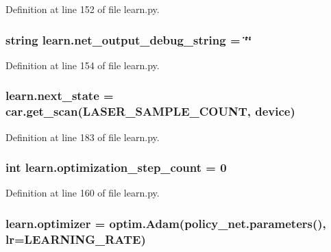 Definition at line 152 of file learn.\+py.

\subsubsection[{\texorpdfstring{net\+\_\+output\+\_\+debug\+\_\+string}{net_output_debug_string}}]{\setlength{\rightskip}{0pt plus 5cm}string learn.\+net\+\_\+output\+\_\+debug\+\_\+string = \char`\"{}\char`\"{}}\hypertarget{namespacelearn_a2cfc8cc1bdb6765aba4bd1de7af92885}{}\label{namespacelearn_a2cfc8cc1bdb6765aba4bd1de7af92885}


Definition at line 154 of file learn.\+py.

\subsubsection[{\texorpdfstring{next\+\_\+state}{next_state}}]{\setlength{\rightskip}{0pt plus 5cm}learn.\+next\+\_\+state = {\bf car.\+get\+\_\+scan}(L\+A\+S\+E\+R\+\_\+\+S\+A\+M\+P\+L\+E\+\_\+\+C\+O\+U\+NT, {\bf device})}\hypertarget{namespacelearn_af84ef16d78643794df249943a937c8a1}{}\label{namespacelearn_af84ef16d78643794df249943a937c8a1}


Definition at line 183 of file learn.\+py.

\subsubsection[{\texorpdfstring{optimization\+\_\+step\+\_\+count}{optimization_step_count}}]{\setlength{\rightskip}{0pt plus 5cm}int learn.\+optimization\+\_\+step\+\_\+count = 0}\hypertarget{namespacelearn_af7c116c0d6b60453699825c2f7c17696}{}\label{namespacelearn_af7c116c0d6b60453699825c2f7c17696}


Definition at line 160 of file learn.\+py.

\subsubsection[{\texorpdfstring{optimizer}{optimizer}}]{\setlength{\rightskip}{0pt plus 5cm}learn.\+optimizer = optim.\+Adam(policy\+\_\+net.\+parameters(), lr=L\+E\+A\+R\+N\+I\+N\+G\+\_\+\+R\+A\+TE)}\hypertarget{namespacelearn_ac338ecc10d74abd2f4882f19a6305c67}{}\label{namespacelearn_ac338ecc10d74abd2f4882f19a6305c67}


